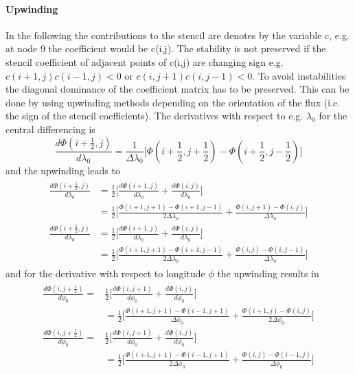 \paragraph{Upwinding}
In the following the contributions to the stencil
are denotes by the variable c, e.g. at node 9 the coefficient would be c(i,j).
The stability is not preserved if the stencil coefficient of adjacent points 
of c(i,j) are changing sign e.g. $c(i+1,j)c(i-1,j) <0$ or
$c(i,j+1)c(i,j-1) <0$.
To avoid instabilities the diagonal dominance of the coefficient matrix
has to be preserved. This can be done by using upwinding methods 
depending on the orientation of the flux (i.e. the sign of the
stencil coefficients).   The derivatives with respect to e.g. $\lambda_0$ for the central
differencing is
%
\begin{equation}
 \frac{d\Phi(i+\frac{1}{2},j)}{d \lambda_0} = \frac{1}{\Delta \lambda_0} \bigl[ 
    \Phi(i+\frac{1}{2},j+\frac{1}{2}) - \Phi(i+\frac{1}{2},j-\frac{1}{2})\bigr]
\end{equation}
%
and the upwinding leads to
%
\begin{align}
\begin{split}
 \frac{d\Phi(i+\frac{1}{2},j)}{d \lambda_0} &= \frac{1}{2} \bigl[ 
   \frac{d\Phi(i+1,j)}{d \lambda_0}+ \frac{d\Phi(i,j)}{d \lambda_0}\bigr] \\
   &=\frac{1}{2 } \bigl[ \frac{\Phi(i+1,j+1) - 
   \Phi(i+1,j-1)}{2\Delta \lambda_0} + \frac{\Phi(i,j+1)- \Phi(i,j)}{ \Delta \lambda_0}
   \bigr] \\
 \frac{d\Phi(i+\frac{1}{2},j)}{d \lambda_0} &= \frac{1}{2} \bigl[ 
   \frac{d\Phi(i+1,j)}{d \lambda_0}+ \frac{d\Phi(i,j)}{d \lambda_0}\bigr] \\
   &=\frac{1}{2 } \bigl[ \frac{\Phi(i+1,j+1) - 
   \Phi(i+1,j-1)}{2\Delta \lambda_0} + \frac{\Phi(i,j)- \Phi(i,j-1)}{ \Delta \lambda_0}
   \bigr]
\end{split}
\end{align}
%
and for the derivative with respect to longitude $\phi$ the upwinding results in
%
\begin{align}
\begin{split}
 \frac{d\Phi(i,j+\frac{1}{2})}{d \phi_0} =& \frac{1}{2} \bigl[ 
   \frac{d\Phi(i,j+1)}{d \phi_0}+ \frac{d\Phi(i,j)}{d \phi_0}\bigr] \\
   &= \frac{1}{2 } \bigl[ \frac{\Phi(i+1,j+1) - 
   \Phi(i-1,j+1)}{\Delta \phi_0} + \frac{\Phi(i+1,j)- \Phi(i,j)}{2 \Delta \phi_0}
   \bigr] \\
\frac{d\Phi(i,j+\frac{1}{2})}{d \phi_0} =& \frac{1}{2} \bigl[ 
   \frac{d\Phi(i,j+1)}{d \phi_0}+ \frac{d\Phi(i,j)}{d \phi_0}\bigr] \\
   &= \frac{1}{2 } \bigl[ \frac{\Phi(i+1,j+1) - 
   \Phi(i-1,j+1)}{2 \Delta \phi_0} + \frac{\Phi(i,j)- \Phi(i-1,j)}{ \Delta \phi_0}
   \bigr] 
\end{split}
\end{align}
